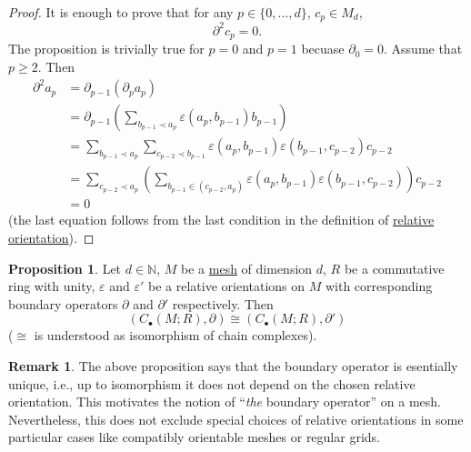 \documentclass[fleqn]{article}
\theoremstyle{definition}
\newtheorem{proposition}[theorem]{Proposition}
\newtheorem{remark}[theorem]{Remark}
\newcommand{\N}{\mathbb{N}}
\begin{document}
\begin{proof}
  It is enough to prove that for any $p \in \{0, ..., d\}$, $c_p \in M_d$,
  \begin{equation}
    \partial^2 c_p = 0. 
  \end{equation}
  The proposition is trivially true for $p = 0$ and $p = 1$
  becuase $\partial_0 = 0$.
  Assume that $p \geq 2$.
  Then
  \begin{equation}
    \begin{split}
      \partial^2 a_p
      & = \partial_{p - 1} (\partial_p a_p) \\
      & = \partial_{p - 1}
      \left(
        \sum_{b_{p - 1} \prec a_p} \varepsilon(a_p, b_{p - 1}) b_{p - 1}
      \right) \\
      & =
      \sum_{b_{p - 1} \prec a_p}
        \sum_{c_{p - 2} \prec b_{p - 1}}
            \varepsilon(a_p, b_{p - 1})
            \varepsilon(b_{p - 1}, c_{p - 2})
            c_{p - 2} \\
      & =
      \sum_{c_{p - 2} \prec a_p}
        \left(
          \sum _{b_{p - 1} \in (c_{p - 2}, a_p)}
            \varepsilon(a_p, b_{p - 1}) \varepsilon(b_{p - 1}, c_{p - 2})
        \right)
        c_{p - 2} \\
      & = 0
    \end{split}
  \end{equation}
  (the last equation follows from the last condition in the definition of
  \hyperref[idec:relative_orientation:definition]{relative orientation}).
\end{proof}

\begin{proposition}
  Let
    $d \in \N$,
    $M$ be a \hyperref[idec:mesh:definition]{mesh} of dimension $d$,
    $R$ be a commutative ring with unity,
    $\varepsilon$ and $\varepsilon'$ be a relative orientations on $M$
      with corresponding boundary operators
      $\partial$ and $\partial'$ respectively.
  Then
  \begin{equation}
    (C_\bullet(M; R), \partial) \cong (C_\bullet(M; R), \partial')
  \end{equation}
  ($\cong$ is understood as isomorphism of chain complexes).
\end{proposition}

\begin{remark}
  The above proposition says that the boundary operator is esentially unique,
  i.e., up to isomorphism it does not depend on the chosen relative orientation.
  This motivates the notion of ``\emph{the} boundary operator'' on a mesh.
  Nevertheless, this does not exclude special choices of relative orientations
  in some particular cases like compatibly orientable meshes or regular grids.
\end{remark}
\end{document}
